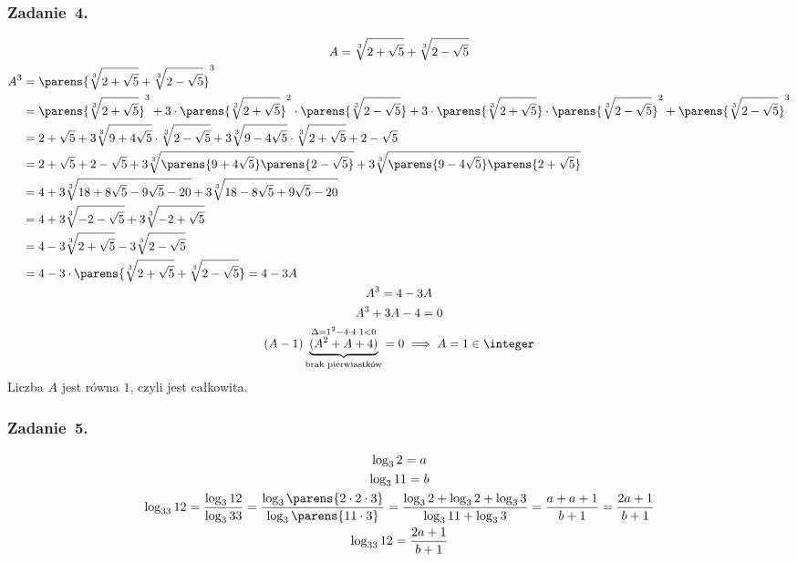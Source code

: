 \subsubsection*{Zadanie~4.}
\begin{gather*}
    A = \sqrt[3]{2 + \sqrt{5}} + \sqrt[3]{2 - \sqrt{5}}\\
    \begin{split}
        A^3 &= \parens{\sqrt[3]{2 + \sqrt{5}} + \sqrt[3]{2 - \sqrt{5}}}^3\\
            &= \parens{\sqrt[3]{2 + \sqrt{5}}}^3 + 3 \cdot \parens{\sqrt[3]{2 + \sqrt{5}}}^2 \cdot \parens{\sqrt[3]{2 - \sqrt{5}}} + 3 \cdot \parens{\sqrt[3]{2 + \sqrt{5}}} \cdot \parens{\sqrt[3]{2 - \sqrt{5}}}^2 + \parens{\sqrt[3]{2 - \sqrt{5}}}^3\\
            &= 2 + \sqrt{5} + 3\sqrt[3]{9 + 4\sqrt{5}} \cdot \sqrt[3]{2 - \sqrt{5}} + 3\sqrt[3]{9 - 4\sqrt{5}} \cdot \sqrt[3]{2 + \sqrt{5}} + 2 - \sqrt{5}\\
            &= 2 + \sqrt{5} + 2 - \sqrt{5} + 3\sqrt[3]{\parens{9 + 4\sqrt{5}} \parens{2 - \sqrt{5}}} + 3\sqrt[3]{\parens{9 - 4\sqrt{5}} \parens{2 + \sqrt{5}}}\\
            &= 4 + 3\sqrt[3]{18 + 8\sqrt{5} - 9\sqrt{5} - 20} + 3\sqrt[3]{18 - 8\sqrt{5} + 9\sqrt{5} - 20}\\
            &= 4 + 3\sqrt[3]{-2 - \sqrt{5}} + 3\sqrt[3]{-2 + \sqrt{5}}\\
            &= 4 - 3\sqrt[3]{2 + \sqrt{5}} - 3\sqrt[3]{2 - \sqrt{5}}\\
            &= 4 - 3 \cdot \parens{\sqrt[3]{2 + \sqrt{5}} + \sqrt[3]{2 - \sqrt{5}}}
            = 4 - 3A
    \end{split}\\
    A^3 = 4 - 3A\\
    A^3 + 3A - 4 = 0\\
    (A - 1)\underbrace{\overset{\Delta = 1^2 - 4 \cdot 4 \cdot 1 < 0}{(A^2 + A + 4)}}_{\text{brak pierwiastków}} = 0 \implies A = 1 \in \integer
\end{gather*}
Liczba \(A\) jest równa \(1\), czyli jest całkowita.
\subsubsection*{Zadanie~5.}
\begin{gather*}
    \log_{3}{2} = a\\
    \log_{3}{11} = b\\
    \log_{33}{12}
        = \frac{\log_{3}{12}}{\log_{3}{33}}
        = \frac{\log_{3}{\parens{2 \cdot 2 \cdot 3}}}{\log_{3}{\parens{11 \cdot 3}}}
        = \frac{\log_{3}{2} + \log_{3}{2} + \log_{3}{3}}{\log_{3}{11} + \log_{3}{3}}
        = \frac{a + a + 1}{b + 1}
        = \frac{2a + 1}{b +1}\\
    \log_{33}{12} = \frac{2a + 1}{b + 1}
\end{gather*}
